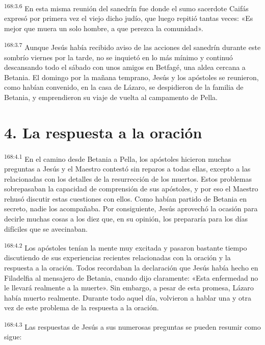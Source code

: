 \par 
\textsuperscript{168:3.6} En esta misma reunión del sanedrín fue donde el sumo sacerdote Caifás expresó por primera vez el viejo dicho judío, que luego repitió tantas veces: «Es mejor que muera un solo hombre, a que perezca la comunidad».

\par 
\textsuperscript{168:3.7} Aunque Jesús había recibido aviso de las acciones del sanedrín durante este sombrío viernes por la tarde, no se inquietó en lo más mínimo y continuó descansando todo el sábado con unos amigos en Betfagé, una aldea cercana a Betania. El domingo por la mañana temprano, Jesús y los apóstoles se reunieron, como habían convenido, en la casa de Lázaro, se despidieron de la familia de Betania, y emprendieron su viaje de vuelta al campamento de Pella.

\section*{4. La respuesta a la oración}
\par 
\textsuperscript{168:4.1} En el camino desde Betania a Pella, los apóstoles hicieron muchas preguntas a Jesús y el Maestro contestó sin reparos a todas ellas, excepto a las relacionadas con los detalles de la resurrección de los muertos. Estos problemas sobrepasaban la capacidad de comprensión de sus apóstoles, y por eso el Maestro rehusó discutir estas cuestiones con ellos. Como habían partido de Betania en secreto, nadie los acompañaba. Por consiguiente, Jesús aprovechó la ocasión para decirle muchas cosas a los diez que, en su opinión, los prepararía para los días difíciles que se avecinaban.

\par 
\textsuperscript{168:4.2} Los apóstoles tenían la mente muy excitada y pasaron bastante tiempo discutiendo de sus experiencias recientes relacionadas con la oración y la respuesta a la oración. Todos recordaban la declaración que Jesús había hecho en Filadelfia al mensajero de Betania, cuando dijo claramente: «Esta enfermedad no le llevará realmente a la muerte». Sin embargo, a pesar de esta promesa, Lázaro había muerto realmente. Durante todo aquel día, volvieron a hablar una y otra vez de este problema de la respuesta a la oración.

\par 
\textsuperscript{168:4.3} Las respuestas de Jesús a sus numerosas preguntas se pueden resumir como sigue:

